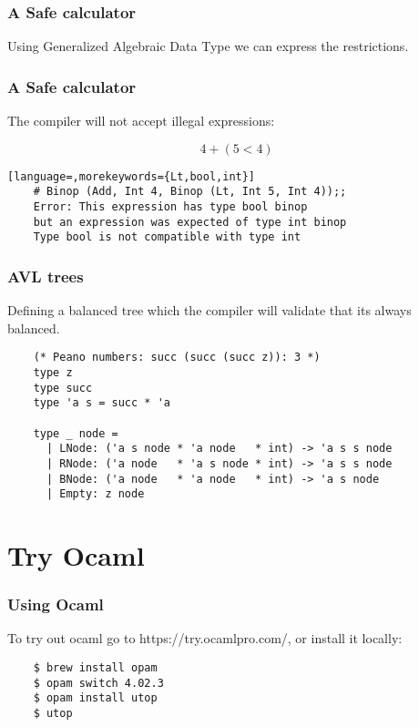\documentclass[xcolor=svgnames]{beamer}
\renewcommand{\_}{\mathunderscore}
\begin{document}
\begin{frame}[fragile]
  \frametitle{A Safe calculator}
  Using Generalized Algebraic Data Type we can express the restrictions.

  
\end{frame}

\begin{frame}[fragile]
  \frametitle{A Safe calculator}
  The compiler will not accept illegal expressions:

  \[4 + (5 < 4)\]

  \begin{lstlisting}[language=,morekeywords={Lt,bool,int}]
    # Binop (Add, Int 4, Binop (Lt, Int 5, Int 4));;
    Error: This expression has type bool binop
    but an expression was expected of type int binop
    Type bool is not compatible with type int
  \end{lstlisting}

\end{frame}

\begin{frame}[fragile]
  \frametitle{AVL trees}
  Defining a balanced tree which the compiler will validate that its
  always balanced.

  \begin{lstlisting}
    (* Peano numbers: succ (succ (succ z)): 3 *)
    type z
    type succ
    type 'a s = succ * 'a

    type _ node =
      | LNode: ('a s node * 'a node   * int) -> 'a s s node
      | RNode: ('a node   * 'a s node * int) -> 'a s s node
      | BNode: ('a node   * 'a node   * int) -> 'a s node
      | Empty: z node
  \end{lstlisting}

\end{frame}

\section{Try Ocaml}
\begin{frame}[fragile]
  \frametitle{Using Ocaml}
  To try out ocaml go to https://try.ocamlpro.com/, or install it locally:
  \begin{lstlisting}
    $ brew install opam
    $ opam switch 4.02.3
    $ opam install utop
    $ utop
  \end{lstlisting}
\end{frame}
\end{document}
